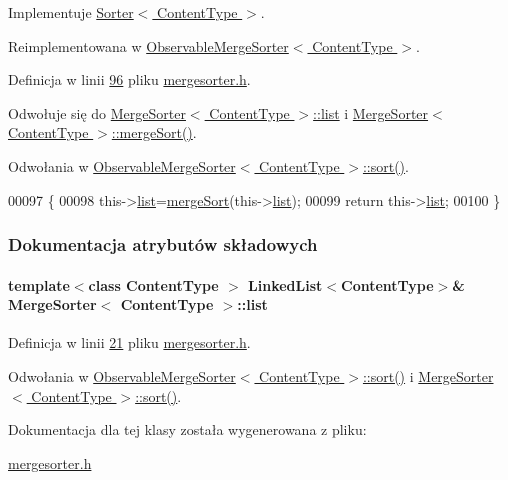 Implementuje \hyperlink{class_sorter_a880cfd8969b78557ed207ad6f2bd4819}{Sorter$<$ Content\-Type $>$}.



Reimplementowana w \hyperlink{class_observable_merge_sorter_adc1960b58289c829ca9c77b7b6bc306f}{Observable\-Merge\-Sorter$<$ Content\-Type $>$}.



Definicja w linii \hyperlink{mergesorter_8h_source_l00096}{96} pliku \hyperlink{mergesorter_8h_source}{mergesorter.\-h}.



Odwołuje się do \hyperlink{mergesorter_8h_source_l00021}{Merge\-Sorter$<$ Content\-Type $>$\-::list} i \hyperlink{mergesorter_8h_source_l00074}{Merge\-Sorter$<$ Content\-Type $>$\-::merge\-Sort()}.



Odwołania w \hyperlink{observablemergesorter_8h_source_l00026}{Observable\-Merge\-Sorter$<$ Content\-Type $>$\-::sort()}.


\begin{DoxyCode}
00097         \{
00098                 this->\hyperlink{class_merge_sorter_a2fdeadd95d226a04243bab8b5104e324}{list}=\hyperlink{class_merge_sorter_a18cea501ccb017ea6a725698254ccd3f}{mergeSort}(this->\hyperlink{class_merge_sorter_a2fdeadd95d226a04243bab8b5104e324}{list});
00099                 \textcolor{keywordflow}{return} this->\hyperlink{class_merge_sorter_a2fdeadd95d226a04243bab8b5104e324}{list};
00100         \}
\end{DoxyCode}


\subsubsection{Dokumentacja atrybutów składowych}
\hypertarget{class_merge_sorter_a2fdeadd95d226a04243bab8b5104e324}{
\paragraph[{list}]{\setlength{\rightskip}{0pt plus 5cm}template$<$class Content\-Type $>$ {\bf Linked\-List}$<$Content\-Type$>$\& {\bf Merge\-Sorter}$<$ Content\-Type $>$\-::list}}\label{class_merge_sorter_a2fdeadd95d226a04243bab8b5104e324}


Definicja w linii \hyperlink{mergesorter_8h_source_l00021}{21} pliku \hyperlink{mergesorter_8h_source}{mergesorter.\-h}.



Odwołania w \hyperlink{observablemergesorter_8h_source_l00026}{Observable\-Merge\-Sorter$<$ Content\-Type $>$\-::sort()} i \hyperlink{mergesorter_8h_source_l00096}{Merge\-Sorter$<$ Content\-Type $>$\-::sort()}.



Dokumentacja dla tej klasy została wygenerowana z pliku\-:\begin{DoxyCompactItemize}
\item 
\hyperlink{mergesorter_8h}{mergesorter.\-h}\end{DoxyCompactItemize}
